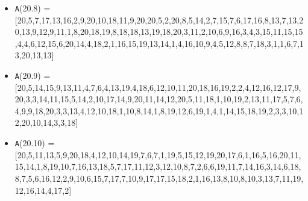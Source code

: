 \documentclass[runningheads,a4paper]{llncs}
\begin{document}
\begin{itemize}
	\item {\texttt A(20.8) = } [20,5,7,17,13,16,2,9,20,10,18,11,9,20,20,5,2,20,8,5,14,2,7,15,7,6,17,16,8,13,7,13,20,13,9,12,9,11,1,8,20,18,19,8,18,18,13,19,18,20,3,11,2,10,6,9,16,3,4,3,15,11,15,15,4,4,6,12,15,6,20,14,4,18,2,1,16,15,19,13,14,1,4,16,10,9,4,5,12,8,8,7,18,3,1,1,6,7,13,20,13,13]
	
	\item {\texttt A(20.9) = } [20,5,14,15,9,13,11,4,7,6,4,13,19,4,18,6,12,10,11,20,18,16,19,2,2,4,12,16,12,17,9,20,3,3,14,11,15,5,14,2,10,17,14,9,20,11,14,12,20,5,11,18,1,10,19,2,13,11,17,5,7,6,4,9,9,18,20,3,3,13,4,12,10,18,1,10,8,14,1,8,19,12,6,19,1,4,1,14,15,18,19,2,3,3,10,12,20,10,14,3,3,18]
	
	\item {\texttt A(20.10) = } [20,5,11,13,5,9,20,18,4,12,10,14,19,7,6,7,1,19,5,15,12,19,20,17,6,1,16,5,16,20,11,15,14,1,8,19,10,7,16,13,18,5,7,17,11,12,3,12,10,8,7,2,6,6,19,11,7,14,16,3,14,6,18,8,7,5,6,16,12,2,9,10,6,15,7,17,7,10,9,17,17,15,18,2,1,16,13,8,10,8,10,3,13,7,11,19,12,16,14,4,17,2]
\end{itemize}
\end{document}
